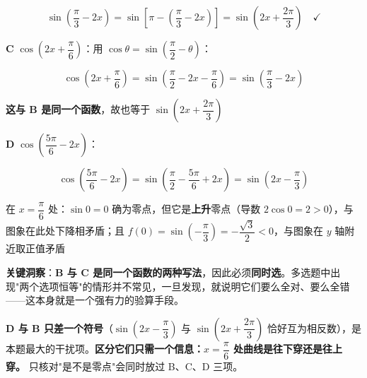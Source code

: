 \begin{answer}
\nopagebreak[4]
\[\sin\left(\frac\pi3-2x\right)=\sin\left[\pi-\left(\frac\pi3-2x\right)\right]=\sin\left(2x+\frac{2\pi}3\right)\quad\checkmark\]

\textbf{C} $\cos\left(2x+\dfrac\pi6\right)$：用 $\cos\theta=\sin\left(\dfrac\pi2-\theta\right)$：

\nopagebreak[4]
\[\cos\left(2x+\frac\pi6\right)=\sin\left(\frac\pi2-2x-\frac\pi6\right)=\sin\left(\frac\pi3-2x\right)\]

\textbf{这与 B 是同一个函数}，故也等于 $\sin\left(2x+\dfrac{2\pi}3\right)$ 

\textbf{D} $\cos\left(\dfrac{5\pi}6-2x\right)$：

\nopagebreak[4]
\[\cos\left(\frac{5\pi}6-2x\right)=\sin\left(\frac\pi2-\frac{5\pi}6+2x\right)=\sin\left(2x-\frac\pi3\right)\]

在 $x=\dfrac\pi6$ 处：$\sin0=0$ 确为零点，但它是\textbf{上升}零点（导数 $2\cos0=2>0$），与图象在此处下降相矛盾；且 $f(0)=\sin\left(-\dfrac\pi3\right)=-\dfrac{\sqrt3}2<0$，与图象在 $y$ 轴附近取正值矛盾 

\begin{gktip}
\textbf{关键洞察}：\textbf{B 与 C 是同一个函数的两种写法}，因此必须\textbf{同时选}。多选题中出现"两个选项恒等"的情形并不常见，一旦发现，就说明它们要么全对、要么全错——这本身就是一个强有力的验算手段。

\textbf{D 与 B 只差一个符号}（$\sin\left(2x-\dfrac\pi3\right)$ 与 $\sin\left(2x+\dfrac{2\pi}3\right)$ 恰好互为相反数），是本题最大的干扰项。\textbf{区分它们只需一个信息：$x=\dfrac\pi6$ 处曲线是往下穿还是往上穿。} 只核对"是不是零点"会同时放过 B、C、D 三项。
\end{gktip}


\par\medskip

\end{answer}
